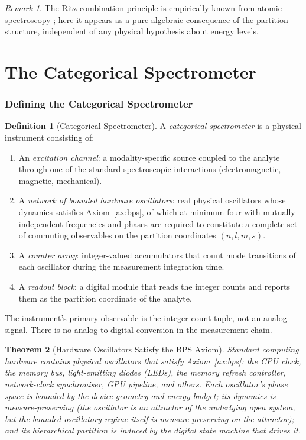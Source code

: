 \documentclass[11pt,a4paper]{article}
\theoremstyle{thmstyle}
\newtheorem{theorem}{Theorem}[section]
\theoremstyle{axiomstyle}
\theoremstyle{definition}
\newtheorem{definition}[theorem]{Definition}
\theoremstyle{remark}
\newtheorem*{remark}{Remark}
\begin{document}
\begin{remark}
The Ritz combination principle is empirically known from atomic spectroscopy \citep{rydberg1890,ritz1908}; here it appears as a pure algebraic consequence of the partition structure, independent of any physical hypothesis about energy levels.
\end{remark}

\clearpage

\part{The Categorical Spectrometer}
\label{part:cs}

\section{Defining the Categorical Spectrometer}
\label{sec:cs}

\begin{definition}[Categorical Spectrometer]\label{def:cs}
A \emph{categorical spectrometer} is a physical instrument consisting of:
\begin{enumerate}[label=(\arabic*),nosep]
\item An \emph{excitation channel}: a modality-specific source coupled to the analyte through one of the standard spectroscopic interactions (electromagnetic, magnetic, mechanical).
\item A \emph{network of bounded hardware oscillators}: real physical oscillators whose dynamics satisfies Axiom~\ref{ax:bps}, of which at minimum four with mutually independent frequencies and phases are required to constitute a complete set of commuting observables on the partition coordinates $(n,l,m,s)$.
\item A \emph{counter array}: integer-valued accumulators that count mode transitions of each oscillator during the measurement integration time.
\item A \emph{readout block}: a digital module that reads the integer counts and reports them as the partition coordinate of the analyte.
\end{enumerate}
The instrument's primary observable is the integer count tuple, not an analog signal. There is no analog-to-digital conversion in the measurement chain.
\end{definition}

\begin{theorem}[Hardware Oscillators Satisfy the BPS Axiom]\label{thm:hardware}
Standard computing hardware contains physical oscillators that satisfy Axiom~\ref{ax:bps}: the CPU clock, the memory bus, light-emitting diodes (LEDs), the memory refresh controller, network-clock synchroniser, GPU pipeline, and others. Each oscillator's phase space is bounded by the device geometry and energy budget; its dynamics is measure-preserving (the oscillator is an attractor of the underlying open system, but the bounded oscillatory regime itself is measure-preserving on the attractor); and its hierarchical partition is induced by the digital state machine that drives it.
\end{theorem}
\end{document}
